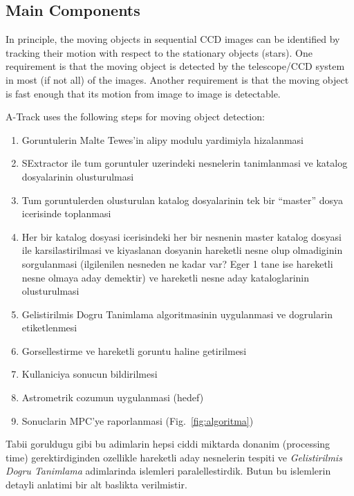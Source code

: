 \documentclass[review]{elsarticle}
\begin{document}
\subsection{Main Components}

In principle, the moving objects in sequential CCD images can be identified by tracking their motion with respect to the stationary objects (stars). One requirement is that the moving object is detected by the telescope/CCD system in most (if not all) of the images. Another requirement is that the moving object is fast enough that its motion from image to image is detectable.

A-Track uses the following steps for moving object detection:

\begin{enumerate}
  \item Goruntulerin Malte Tewes’in alipy \citep{alipy} modulu yardimiyla hizalanmasi
  \item SExtractor \citep{bertin1996} ile tum goruntuler uzerindeki nesnelerin tanimlanmasi ve katalog dosyalarinin olusturulmasi
  \item Tum goruntulerden olusturulan katalog dosyalarinin tek bir “master” dosya icerisinde toplanmasi
  \item Her bir katalog dosyasi icerisindeki her bir nesnenin master katalog dosyasi ile karsilastirilmasi ve kiyaslanan dosyanin hareketli nesne olup olmadiginin sorgulanmasi (ilgilenilen nesneden ne kadar var? Eger 1 tane ise hareketli nesne olmaya aday demektir) ve hareketli nesne aday kataloglarinin olusturulmasi
  \item Gelistirilmis Dogru Tanimlama algoritmasinin uygulanmasi ve dogrularin etiketlenmesi
  \item Gorsellestirme ve hareketli goruntu haline getirilmesi
  \item Kullaniciya sonucun bildirilmesi
  \item Astrometrik cozumun uygulanmasi (hedef)
  \item Sonuclarin MPC’ye raporlanmasi (Fig.~\ref{fig:algoritma})
\end{enumerate}

Tabii goruldugu gibi bu adimlarin hepsi ciddi miktarda donanim (processing time) gerektirdiginden ozellikle hareketli aday nesnelerin tespiti ve \textit{Gelistirilmis Dogru Tanimlama} adimlarinda islemleri paralellestirdik. Butun bu islemlerin detayli anlatimi bir alt baslikta verilmistir.
\end{document}
